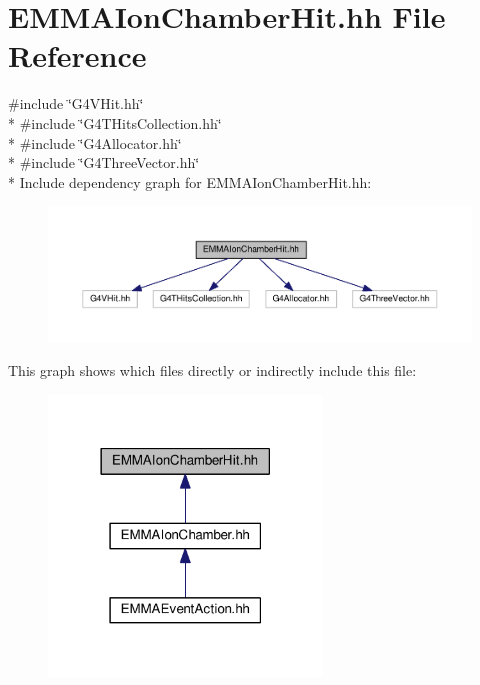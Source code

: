 \hypertarget{EMMAIonChamberHit_8hh}{}\section{E\+M\+M\+A\+Ion\+Chamber\+Hit.\+hh File Reference}
\label{EMMAIonChamberHit_8hh}
{\ttfamily \#include \char`\"{}G4\+V\+Hit.\+hh\char`\"{}}\\*
{\ttfamily \#include \char`\"{}G4\+T\+Hits\+Collection.\+hh\char`\"{}}\\*
{\ttfamily \#include \char`\"{}G4\+Allocator.\+hh\char`\"{}}\\*
{\ttfamily \#include \char`\"{}G4\+Three\+Vector.\+hh\char`\"{}}\\*
Include dependency graph for E\+M\+M\+A\+Ion\+Chamber\+Hit.\+hh\+:
\nopagebreak
\begin{figure}[H]
\begin{center}
\leavevmode
\includegraphics[width=350pt]{EMMAIonChamberHit_8hh__incl}
\end{center}
\end{figure}
This graph shows which files directly or indirectly include this file\+:
\nopagebreak
\begin{figure}[H]
\begin{center}
\leavevmode
\includegraphics[width=206pt]{EMMAIonChamberHit_8hh__dep__incl}
\end{center}
\end{figure}
